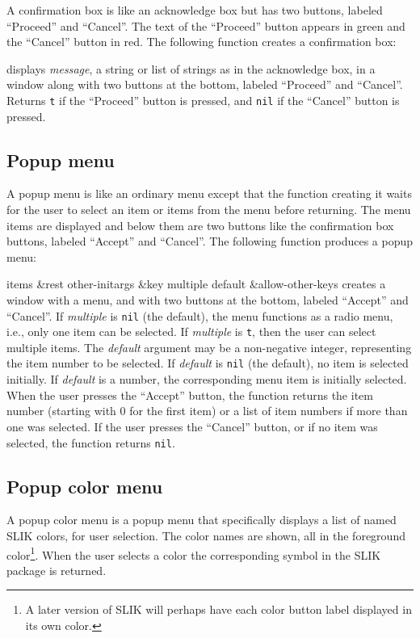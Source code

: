 \documentclass[twoside,openright,11pt]{report}
\newcommand{\tp}[1]{\texttt{#1}}
\begin{document}
A confirmation box is like an acknowledge box but has two buttons,
labeled ``Proceed'' and ``Cancel''.  The text of the ``Proceed''
button appears in green and the ``Cancel'' button in red.  The
following function creates a confirmation box:

{displays \emph{message}, a string or list of strings as in the
acknowledge box, in a window along with two buttons at the bottom,
labeled ``Proceed'' and ``Cancel''.  Returns \tp{t} if the
``Proceed'' button is pressed, and \tp{nil} if the ``Cancel''
button is pressed.}

\subsection{Popup menu}

A popup menu is like an ordinary menu except that the function
creating it waits for the user to select an item or items from the
menu before returning.  The menu items are displayed and below them
are two buttons like the confirmation box buttons, labeled ``Accept''
and ``Cancel''.  The following function produces a popup menu:

 {items \&rest other-initargs
\&key multiple default \&allow-other-keys} {creates a window with a
menu, and with two buttons at the bottom, labeled ``Accept'' and
``Cancel''.  If \textit{multiple} is \tp{nil} (the default), the menu
functions as a radio menu, i.e., only one item can be selected.  If
\textit{multiple} is \tp{t}, then the user can select multiple items.
The \textit{default} argument may be a non-negative integer,
representing the item number to be selected.  If \textit{default} is
\tp{nil} (the default), no item is selected initially.  If
\textit{default} is a number, the corresponding menu item is initially
selected.  When the user presses the ``Accept'' button, the function
returns the item number (starting with 0 for the first item) or a list
of item numbers if more than one was selected.  If the user presses
the ``Cancel'' button, or if no item was selected, the function
returns \tp{nil}.}

\subsection{Popup color menu} \label{sec:colormenu}

A popup color menu is a popup menu that specifically displays a list
of named SLIK colors, for user selection.  The color names are shown,
all in the foreground color\footnote{A later version of SLIK will
perhaps have each color button label displayed in its own color.}.
When the user selects a color the corresponding symbol in the SLIK
package is returned.
\end{document}
